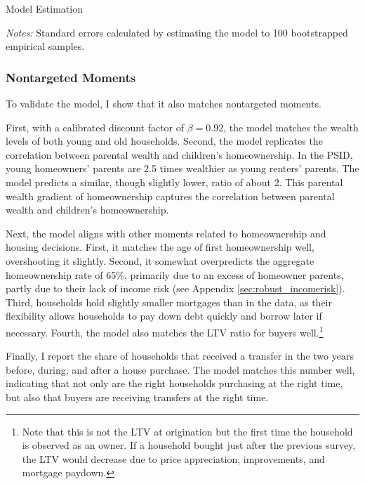\documentclass[12pt]{article}
\begin{document}
\begin{table}
	\center 
	\begin{threeparttable}
	\caption{Model Estimation}\label{tab:esttable}
		
	
		\begin{tablenotes}
			\footnotesize
			\textit{Notes:} Standard errors calculated by estimating the model to 100 bootstrapped empirical samples.
		\end{tablenotes}
	\end{threeparttable}
\end{table}


\subsubsection{Nontargeted Moments}\label{sec:externalval}
To validate the model, I show that it also matches nontargeted moments. 

First, with a calibrated discount factor of $\beta=0.92$, the model matches the wealth levels of both young and old households. Second, the model replicates the correlation between parental wealth and children's homeownership. In the PSID, young homeowners' parents are 2.5 times wealthier as young renters' parents. The model predicts a similar, though slightly lower, ratio of about 2. This parental wealth gradient of homeownership captures the correlation between parental wealth and children's homeownership. 

Next, the model aligns with other moments related to homeownership and housing decisions. First, it matches the age of first homeownership well, overshooting it slightly. Second, it somewhat overpredicts the aggregate homeownership rate of 65\%, primarily due to an excess of homeowner parents, partly due to their lack of income risk (see Appendix \ref{sec:robust_incomerisk}). Third, households hold slightly smaller mortgages than in the data, as their flexibility allows households to pay down debt quickly and borrow later if necessary. Fourth, the model also matches the LTV ratio for buyers well.\footnote{Note that this is not the LTV at origination but the first time the household is observed as an owner. If a household bought just after the previous survey, the LTV would decrease due to price appreciation, improvements, and mortgage paydown.}

Finally, I report the share of households that received a transfer in the two years before, during, and after a house purchase. The model matches this number well, indicating that not only are the right households purchasing at the right time, but also that buyers are receiving transfers at the right time.
\end{document}

